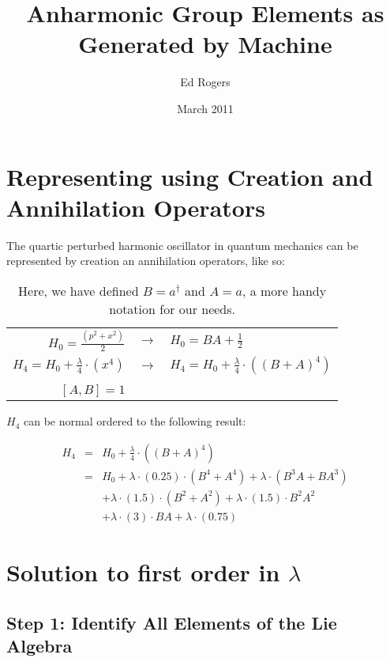 \documentclass{article}
\title{Anharmonic Group Elements as Generated by Machine}
\author{Ed Rogers}
\date{March 2011}
\begin{document}
   \maketitle

\section{Representing using Creation and Annihilation Operators}
\label{secRepresentationIntro}

The quartic perturbed harmonic oscillator in quantum mechanics can be represented by creation an annihilation operators, like so:

\begin{table}[!hp]
\begin{center}
\begin{tabular}{rcl}
$H_{0} = \frac{(p^2+x^2)}{2}$ & $\rightarrow$ & $H_{0} = BA+\frac{1}{2}$ \\
$H_{4} = H_{0} + \frac{\lambda}{4}{\cdot}(x^{4})$ & $\rightarrow$ & $H_{4} = H_{0} + \frac{\lambda}{4}{\cdot}((B+A)^{4})$ \\
& & \\
$[A,B] = 1$ & & \\
\end{tabular}
\caption{Here, we have defined $B=a^{\dagger}$ and $A=a$, a more handy notation for our needs.\label{tabBuildingBlocks}}
\end{center}
\end{table}

$H_{4}$ can be normal ordered to the following result:

\begin{eqnarray}
H_{4} & = & H_{0} + \frac{\lambda}{4}{\cdot}((B+A)^{4}) \\
      & = & H_{0} + {\lambda}{\cdot}(0.25){\cdot}(B^{4}+A^{4}) + {\lambda}{\cdot}(B^{3}A+BA^{3}) \nonumber \\
      &   &  + {\lambda}{\cdot}(1.5){\cdot}(B^{2}+A^{2}) + {\lambda}{\cdot}(1.5){\cdot}B^{2}A^{2} \nonumber \\
      &   &  + {\lambda}{\cdot}(3){\cdot}BA + {\lambda}{\cdot}(0.75)
\end{eqnarray}

\newpage
\section{Solution to first order in $\lambda$}
\label{secFirstOrder}

\subsection{Step 1: Identify All Elements of the Lie Algebra}
\end{document}
